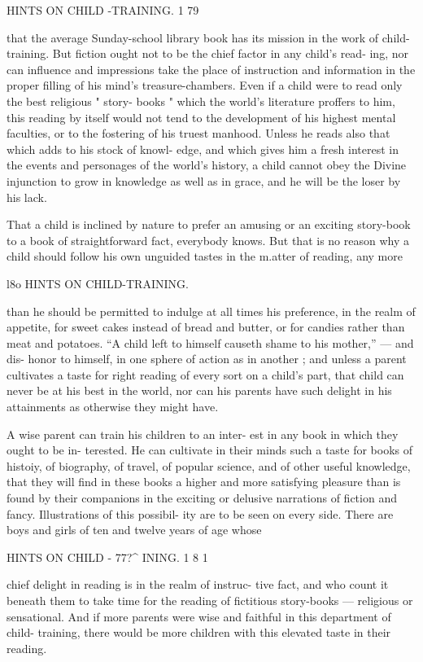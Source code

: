 \documentclass[
]{book}
\begin{document}
HINTS ON CHILD -TRAINING. 1 79

that the average Sunday-school library book has its mission in the work of child-training. But fiction ought not to be the chief factor in any child's read- ing, nor can influence and impressions take the place of instruction and information in the proper filling of his mind's treasure-chambers. Even if a child were to read only the best religious " story- books " which the world's literature proffers to him, this reading by itself would not tend to the development of his highest mental faculties, or to the fostering of his truest manhood. Unless he reads also that which adds to his stock of knowl- edge, and which gives him a fresh interest in the events and personages of the world's history, a child cannot obey the Divine injunction to grow in knowledge as well as in grace, and he will be the loser by his lack.

That a child is inclined by nature to prefer an amusing or an exciting story-book to a book of straightforward fact, everybody knows. But that is no reason why a child should follow his own unguided tastes in the m.atter of reading, any more

l8o HINTS ON CHILD-TRAINING.

than he should be permitted to indulge at all times his preference, in the realm of appetite, for sweet cakes instead of bread and butter, or for candies rather than meat and potatoes. ``A child left to himself causeth shame to his mother,'' --- and dis- honor to himself, in one sphere of action as in another ; and unless a parent cultivates a taste for right reading of every sort on a child's part, that child can never be at his best in the world, nor can his parents have such delight in his attainments as otherwise they might have.

A wise parent can train his children to an inter- est in any book in which they ought to be in- terested. He can cultivate in their minds such a taste for books of histoiy, of biography, of travel, of popular science, and of other useful knowledge, that they will find in these books a higher and more satisfying pleasure than is found by their companions in the exciting or delusive narrations of fiction and fancy. Illustrations of this possibil- ity are to be seen on every side. There are boys and girls of ten and twelve years of age whose

HINTS ON CHILD - 77?\^{} INING. 1 8 1

chief delight in reading is in the realm of instruc- tive fact, and who count it beneath them to take time for the reading of fictitious story-books --- religious or sensational. And if more parents were wise and faithful in this department of child- training, there would be more children with this elevated taste in their reading.
\end{document}
